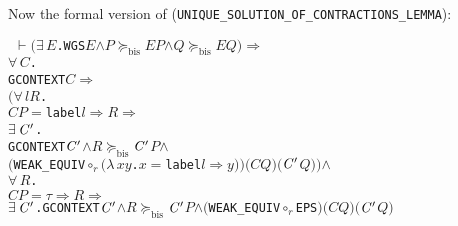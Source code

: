 \documentclass[GCNS]{yincog}
\renewcommand{\HOLConst}[1]{\texttt{#1}}
\renewcommand{\HOLBoundVar}[1]{\ensuremath{\mathit{#1}}}
\renewcommand{\HOLFreeVar}[1]{\ensuremath{\mathit{#1}}}
\renewcommand{\HOLSymConst}[1]{#1}
\renewcommand{\HOLTokenConj}{\ensuremath{\wedge}}
\renewcommand{\HOLTokenRCompose}{\ensuremath{\circ _r}}
\renewcommand{\HOLTokenExists}{\ensuremath{\exists \,}}
\renewcommand{\HOLTokenForall}{\ensuremath{\forall \,}}
\renewcommand{\HOLTokenLambda}{\ensuremath{\lambda \,}}
\renewcommand{\HOLTokenTurnstile}{\ensuremath{\:\:\vdash}}
\theoremstyle{remark}
\theoremstyle{theorem}
\theoremstyle{remark}
\newcommand{\HOLTokenWeakTransBegin}{$=$}
\newcommand{\HOLTokenWeakTransEnd}{$\Rightarrow$\xspace}
\newcommand{\HOLTokenContracts}{$\succeq_{\mathrm{bis}}\!$}
\renewcommand{\HOLTokenImp}{\ensuremath{\Longrightarrow}}
\begin{document}
Now the formal version of  (\texttt{UNIQUE\_SOLUTION\_OF\_CONTRACTIONS\_LEMMA}):
%
\begin{alltt}
\HOLTokenTurnstile{} \ensuremath{(}\HOLSymConst{\HOLTokenExists{}}\HOLBoundVar{E}. \HOLConst{WGS} \HOLBoundVar{E} \HOLSymConst{\HOLTokenConj{}} \HOLFreeVar{P} \HOLSymConst{\HOLTokenContracts{}} \HOLBoundVar{E} \HOLFreeVar{P} \HOLSymConst{\HOLTokenConj{}} \HOLFreeVar{Q} \HOLSymConst{\HOLTokenContracts{}} \HOLBoundVar{E} \HOLFreeVar{Q}\ensuremath{)} \HOLSymConst{\HOLTokenImp{}}
   \HOLSymConst{\HOLTokenForall{}}\HOLBoundVar{C}.
       \HOLConst{GCONTEXT} \HOLBoundVar{C} \HOLSymConst{\HOLTokenImp{}}
       \ensuremath{(}\HOLSymConst{\HOLTokenForall{}}\HOLBoundVar{l} \HOLBoundVar{R}.
            \HOLBoundVar{C} \HOLFreeVar{P} \HOLTokenWeakTransBegin\HOLConst{label} \HOLBoundVar{l}\HOLTokenWeakTransEnd \HOLBoundVar{R} \HOLSymConst{\HOLTokenImp{}}
            \HOLSymConst{\HOLTokenExists{}}\ensuremath{\HOLBoundVar{C}\sp{\prime}}.
                \HOLConst{GCONTEXT} \ensuremath{\HOLBoundVar{C}\sp{\prime}} \HOLSymConst{\HOLTokenConj{}} \HOLBoundVar{R} \HOLSymConst{\HOLTokenContracts{}} \ensuremath{\HOLBoundVar{C}\sp{\prime}} \HOLFreeVar{P} \HOLSymConst{\HOLTokenConj{}}
                \ensuremath{(}\HOLConst{WEAK\_EQUIV} \HOLSymConst{\HOLTokenRCompose{}} \ensuremath{(}\HOLTokenLambda{}\HOLBoundVar{x} \HOLBoundVar{y}. \HOLBoundVar{x} \HOLTokenWeakTransBegin\HOLConst{label} \HOLBoundVar{l}\HOLTokenWeakTransEnd \HOLBoundVar{y}\ensuremath{)}\ensuremath{)} \ensuremath{(}\HOLBoundVar{C} \HOLFreeVar{Q}\ensuremath{)} \ensuremath{(}\ensuremath{\HOLBoundVar{C}\sp{\prime}} \HOLFreeVar{Q}\ensuremath{)}\ensuremath{)} \HOLSymConst{\HOLTokenConj{}}
       \HOLSymConst{\HOLTokenForall{}}\HOLBoundVar{R}.
           \HOLBoundVar{C} \HOLFreeVar{P} \HOLTokenWeakTransBegin\HOLSymConst{\ensuremath{\tau}}\HOLTokenWeakTransEnd \HOLBoundVar{R} \HOLSymConst{\HOLTokenImp{}}
           \HOLSymConst{\HOLTokenExists{}}\ensuremath{\HOLBoundVar{C}\sp{\prime}}. \HOLConst{GCONTEXT} \ensuremath{\HOLBoundVar{C}\sp{\prime}} \HOLSymConst{\HOLTokenConj{}} \HOLBoundVar{R} \HOLSymConst{\HOLTokenContracts{}} \ensuremath{\HOLBoundVar{C}\sp{\prime}} \HOLFreeVar{P} \HOLSymConst{\HOLTokenConj{}} \ensuremath{(}\HOLConst{WEAK\_EQUIV} \HOLSymConst{\HOLTokenRCompose{}} \HOLConst{EPS}\ensuremath{)} \ensuremath{(}\HOLBoundVar{C} \HOLFreeVar{Q}\ensuremath{)} \ensuremath{(}\ensuremath{\HOLBoundVar{C}\sp{\prime}} \HOLFreeVar{Q}\ensuremath{)}
\end{alltt}
\end{document}
